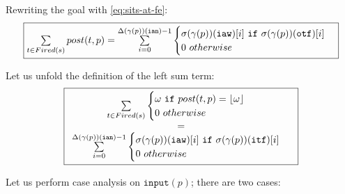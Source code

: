 \noindent{}Rewriting the goal with \eqref{eq:sits-at-fe}:\\
\begin{equation*}
  \fbox{$
    \sum\limits_{t\in{}Fired(s)}post(t,p)=\sum\limits_{i=0}^{\Delta(\gamma(p))(\texttt{ian})-1}
    \begin{cases}
      \sigma(\gamma(p))(\texttt{iaw})[i]~\mathtt{if}~\sigma(\gamma(p))(\texttt{otf})[i]\\
      0~otherwise \\
    \end{cases}$}
\end{equation*}

\noindent{}Let us unfold the definition of the left sum term:\\
\begin{equation*}
  \fbox{$\begin{array}{c}
    \sum\limits_{t\in{}Fired(s)}
    \begin{cases}
      \omega~\mathtt{if}~post(t,p)=\lfloor\omega\rfloor \\
      0~otherwise
    \end{cases} \\
    = \\
    \sum\limits_{i=0}^{\Delta(\gamma(p))(\texttt{ian})-1}
    \begin{cases}
      \sigma(\gamma(p))(\texttt{iaw})[i]~\mathtt{if}~\sigma(\gamma(p))(\texttt{itf})[i]\\
      0~otherwise \\
    \end{cases} \\
  \end{array}$}
\end{equation*}

\noindent{}Let us perform case analysis on $\mathtt{input}(p)$; there
are two cases:

